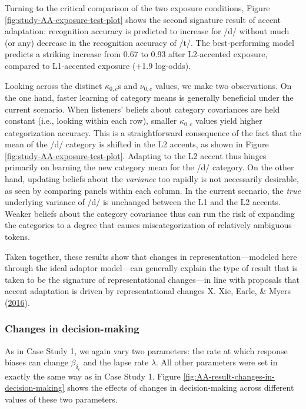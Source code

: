 \documentclass[
  11pt,
  man,floatsintext]{apa6}
\begin{document}
Turning to the critical comparison of the two exposure conditions, Figure \ref{fig:study-AA-exposure-test-plot} shows the second signature result of accent adaptation: recognition accuracy is predicted to increase for /d/ without much (or any) decrease in the recognition accuracy of /t/. The best-performing model predicts a striking increase from 0.67 to 0.93 after L2-accented exposure, compared to L1-accented exposure (+1.9 log-odds).

Looking across the distinct \(\kappa_{0,c}\)s and \(\nu_{0,c}\) values, we make two observations. On the one hand, faster learning of category means is generally beneficial under the current scenario. When listeners' beliefs about category covariances are held constant (i.e., looking within each row), smaller \(\kappa_{0,c}\) values yield higher categorization accuracy. This is a straightforward consequence of the fact that the mean of the /d/ category is shifted in the L2 accents, as shown in Figure \ref{fig:study-AA-exposure-test-plot}. Adapting to the L2 accent thus hinges primarily on learning the new category mean for the /d/ category. On the other hand, updating beliefs about the \emph{variance} too rapidly is not necessarily desirable, as seen by comparing panels within each column. In the current scenario, the \emph{true} underlying variance of /d/ is unchanged between the L1 and the L2 accents. Weaker beliefs about the category covariance thus can run the risk of expanding the categories to a degree that causes miscategorization of relatively ambiguous tokens.

Taken together, these results show that changes in representation---modeled here through the ideal adaptor model---can generally explain the type of result that is taken to be the signature of representational changes---in line with proposals that accent adaptation is driven by representational changes X. Xie, Earle, \& Myers (\protect\hyperlink{ref-xie2016}{2016}).

\hypertarget{changes-in-decision-making-1}{%
\subsubsection{Changes in decision-making}\label{changes-in-decision-making-1}}

As in Case Study 1, we again vary two parameters: the rate at which response biases can change \(\beta_{\delta_\epsilon}\) and the lapse rate \(\lambda\). All other parameters were set in exactly the same way as in Case Study 1. Figure \ref{fig:AA-result-changes-in-decision-making} shows the effects of changes in decision-making across different values of these two parameters.
\end{document}
